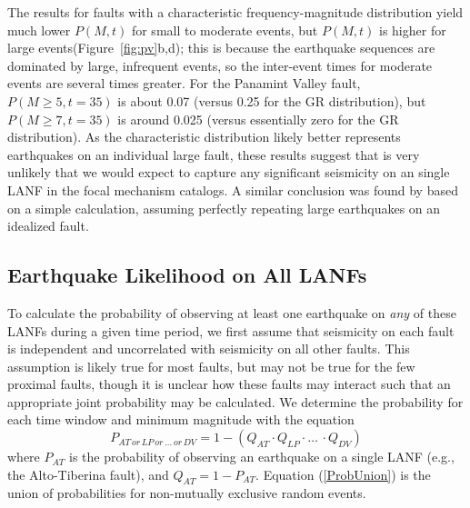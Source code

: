 \documentclass[draft,grl]{AGUTeX}
\begin{document}
\begin{article}
The results for faults with a characteristic frequency-magnitude distribution
yield much lower $P(M,t)$ for small to moderate events, but $P(M,t)$ is higher
for large events(Figure~\ref{fig:pv}b,d); this is because the earthquake
sequences are dominated by large, infrequent events, so the inter-event times
for moderate events are several times greater. For the Panamint Valley fault,
$P(M\ge5,t=35)$ is about 0.07 (versus 0.25 for the GR distribution), but
$P(M\ge 7, t=35)$ is around 0.025 (versus essentially zero for the GR
distribution).  As the characteristic distribution likely better represents
earthquakes on an individual large fault, these results suggest that is very
unlikely that we would expect to capture any significant seismicity on an
single LANF in the focal mechanism catalogs. A similar conclusion was found by
\citet{wernicke1995seis} based on a simple calculation, assuming perfectly
repeating large earthquakes on an idealized fault. 
 
\subsection{Earthquake Likelihood on All LANFs}
To calculate the probability of observing at least one earthquake on \emph{any}
of these LANFs during a given time period, we first assume that seismicity on
each fault is independent and uncorrelated with seismicity on all other faults.
This assumption is likely true for most faults, but may not be true for the few
proximal faults, though it is unclear how these faults may interact such that
an appropriate joint probability may be calculated.  We determine the
probability for each time window and minimum magnitude with the equation
\begin{equation}
P_{AT \, or \, LP\, or\, \ldots \, or \, DV} = 1 - (Q_{AT} \cdot Q_{LP} \cdot \ldots \, \cdot Q_{DV})
\label{ProbUnion}
\end{equation}
where $P_{AT}$ is the probability of observing an earthquake on a single LANF
(e.g., the Alto-Tiberina fault), and $Q_{AT} = 1 - P_{AT}$. Equation
(\ref{ProbUnion}) is the union of probabilities for non-mutually exclusive
random events.


\end{article}
\end{document}

